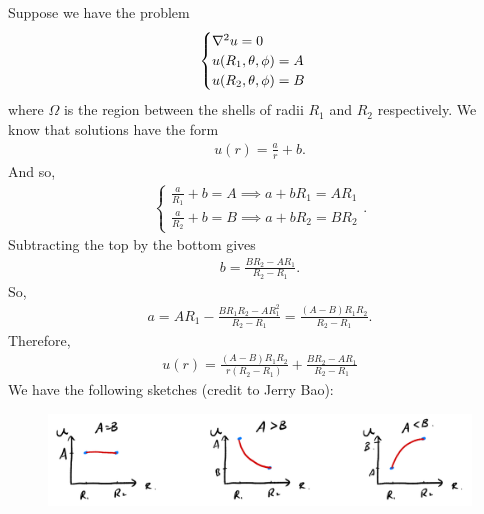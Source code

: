 \documentclass{book}
\theoremstyle{definition}
\newcommand{\f}[2]{\frac{#1}{#2}}
\begin{document}
\begin{enumerate}
	Suppose we have the problem
	\begin{align*}
	\begin{cases}
	\laplacian u = 0\\
	u(R_1,\theta,\phi) = A\\
	u(R_2, \theta, \phi) = B
	\end{cases}
	\end{align*}
	where $\Omega$ is the region between the shells of radii $R_1$ and $R_2$ respectively. We know that solutions have the form 
	\begin{align*}
	u(r) = \f{a}{r} + b.
	\end{align*}
	And so,
	\begin{align*}
	\begin{cases}
	\f{a}{R_1} + b = A \implies a + bR_1 = AR_1\\
	\f{a}{R_2} + b = B \implies a + bR_2 = BR_2
	\end{cases}.
	\end{align*}
	Subtracting the top by the bottom gives
	\begin{align*}
	b = \f{BR_2 - AR_1}{R_2 - R_1}.
	\end{align*}
	So,
	\begin{align*}
	a = AR_1 - \f{BR_1R_2 - AR_1^2}{R_2 - R_1}   = \f{(A-B)R_1R_2}{R_2 - R_1}.
	\end{align*}
	Therefore,
	\begin{align*}
	\boxed{u(r) = \f{(A-B)R_1R_2}{r(R_2 - R_1)} + \f{BR_2 - AR_1}{R_2 - R_1}}
	\end{align*}
	We have the following sketches (credit to Jerry Bao):
	\begin{figure}[h!]
		\centering
		\includegraphics[scale=0.5]{u.png}
	\end{figure}





\end{enumerate}
\end{document}
